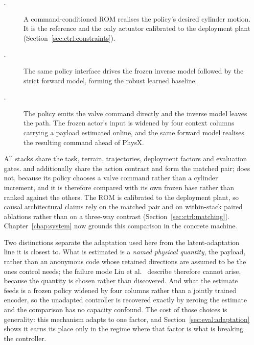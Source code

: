 \begin{description}
  \item[\ppoROM.] A command-conditioned ROM realises the policy's desired
    cylinder motion. It is the reference and the only actuator calibrated to
    the deployment plant (Section~\ref{sec:ctrl:constraints}).
  \item[\ppoIDFD.] The same policy interface drives the frozen inverse model
    followed by the strict forward model, forming the robust learned baseline.
  \item[\ppoAAMFD.] The policy emits the valve command directly and the
    inverse model leaves the path. The frozen actor's input is widened by four
    context columns carrying a payload estimated online, and the same forward
    model realises the resulting command ahead of PhysX.
\end{description}

All stacks share the task, terrain, trajectories, deployment factors and
evaluation gates. \ppoROM{} and \ppoIDFD{} additionally share the action
contract and form the matched pair; \ppoAAMFD{} does not, because its policy
chooses a valve command rather than a cylinder increment, and it is therefore
compared with its own frozen base rather than ranked against the others. The
ROM is calibrated to the deployment plant, so causal architectural claims rely
on the matched pair and on within-stack paired ablations rather than on a
three-way contrast (Section~\ref{sec:ctrl:matching}). Chapter~\ref{chap:system}
now grounds this comparison in the concrete machine.

Two distinctions separate the adaptation used here from the latent-adaptation
line it is closest to. What is estimated is a \emph{named physical quantity},
the payload, rather than an anonymous code whose retained directions are
assumed to be the ones control needs; the failure mode Liu et
al.~\cite{liu2025frma} describe therefore cannot arise, because the quantity is
chosen rather than discovered. And what the estimate feeds is a frozen policy
widened by four columns rather than a jointly trained encoder, so the
unadapted controller is recovered exactly by zeroing the estimate and the
comparison has no capacity confound. The cost of those choices is generality:
this mechanism adapts to one factor, and Section~\ref{sec:eval:adaptation}
shows it earns its place only in the regime where that factor is what is
breaking the controller.
